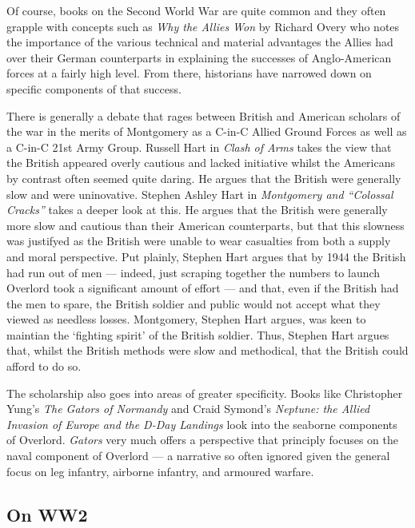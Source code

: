 \documentclass[noraggedright]{turabian-researchpaper}
\begin{document}
Of course, books on the Second World War are quite common and they often
grapple with concepts such as \textit{Why the Allies Won} by Richard Overy
who notes the importance of the various technical and material advantages the 
Allies had over their German counterparts in explaining the successes of 
Anglo-American forces at a fairly high level.%
From there, historians have narrowed down on specific components of that
success.  

There is generally a debate that rages between British and American scholars
of the war in the merits of Montgomery as a C-in-C Allied Ground Forces as
well as a C-in-C 21st Army Group.  Russell Hart in \textit{Clash of Arms} takes
the view that the British appeared overly cautious and lacked initiative whilst 
the Americans by contrast often seemed quite daring.%
He argues that the British were generally slow and
were uninovative.  Stephen Ashley Hart in \textit{Montgomery and ``Colossal
Cracks''} takes a deeper look at this.  He argues that the British were 
generally more slow and cautious than their American counterparts, but that 
this slowness was justifyed as the British were unable to wear casualties from
both a supply and moral perspective.  Put plainly, Stephen Hart argues that by 
1944 the British had run out of men --- indeed, just scraping together the 
numbers to launch Overlord took a significant amount of effort\autocite[56-7]
{cracks}
--- and that, even if the British had the men to spare, the British soldier 
and public would not accept what they 
viewed as needless losses.\autocite[24-5]{cracks}  
Montgomery, Stephen Hart argues, was keen to maintian the `fighting spirit'
of the British soldier.  Thus, Stephen Hart argues that, whilst the British
methods were slow and methodical, that the British could afford to do so.  

The scholarship also goes into areas of greater specificity.  Books like 
Christopher Yung's \textit{The Gators of Normandy} and Craid Symond's 
\textit{Neptune: the Allied Invasion of Europe and the D-Day Landings} 
look into the seaborne components of Overlord.  \textit{Gators} very much
offers a perspective that principly focuses on the naval component of 
Overlord --- a narrative so often ignored given the general focus on 
leg infantry, airborne infantry, and armoured warfare.%

	\subsection{On WW2} %
\end{document}
